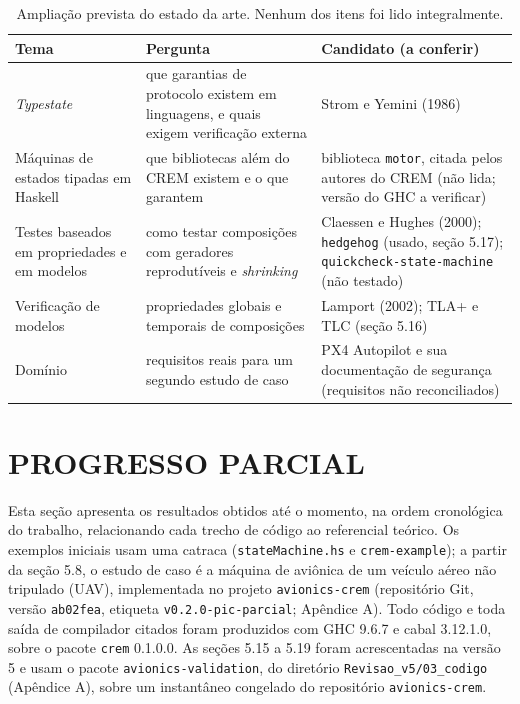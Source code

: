 \documentclass[12pt,a4paper]{article}
\begin{document}
\begin{table}[h]
\centering
\footnotesize
\begin{tabular}{|p{3.4cm}|p{5.6cm}|p{5.0cm}|}
\hline
Tema & Pergunta & Candidato (a conferir) \\
\hline
\textit{Typestate} & que garantias de protocolo existem em linguagens, e quais exigem verificação externa & Strom e Yemini (1986) \\
\hline
Máquinas de estados tipadas em Haskell & que bibliotecas além do CREM existem e o que garantem & biblioteca \texttt{motor}, citada pelos autores do CREM (não lida; versão do GHC a verificar) \\
\hline
Testes baseados em propriedades e em modelos & como testar composições com geradores reprodutíveis e \textit{shrinking} & Claessen e Hughes (2000); \texttt{hedgehog} (usado, seção 5.17); \texttt{quickcheck-}\allowbreak\texttt{state-machine} (não testado) \\
\hline
Verificação de modelos & propriedades globais e temporais de composições & Lamport (2002); TLA+ e TLC (seção 5.16) \\
\hline
Domínio & requisitos reais para um segundo estudo de caso & PX4 Autopilot e sua documentação de segurança (requisitos não reconciliados) \\
\hline
\end{tabular}
\caption{Ampliação prevista do estado da arte. Nenhum dos itens foi lido integralmente.}
\label{tab:ampliacao}
\end{table}

\section{PROGRESSO PARCIAL}

Esta seção apresenta os resultados obtidos até o momento, na ordem cronológica do trabalho, relacionando cada trecho de código ao referencial teórico. Os exemplos iniciais usam uma catraca (\texttt{stateMachine.hs} e \texttt{crem-example}); a partir da seção 5.8, o estudo de caso é a máquina de aviônica de um veículo aéreo não tripulado (UAV), implementada no projeto \texttt{avionics-crem} (repositório Git, versão \texttt{ab02fea}, etiqueta \texttt{v0.2.0-pic-parcial}; Apêndice A). Todo código e toda saída de compilador citados foram produzidos com GHC 9.6.7 e cabal 3.12.1.0, sobre o pacote \texttt{crem} 0.1.0.0. As seções 5.15 a 5.19 foram acrescentadas na versão 5 e usam o pacote \texttt{avionics-validation}, do diretório \texttt{Revisao\_v5/03\_codigo} (Apêndice A), sobre um instantâneo congelado do repositório \texttt{avionics-crem}.
\end{document}
